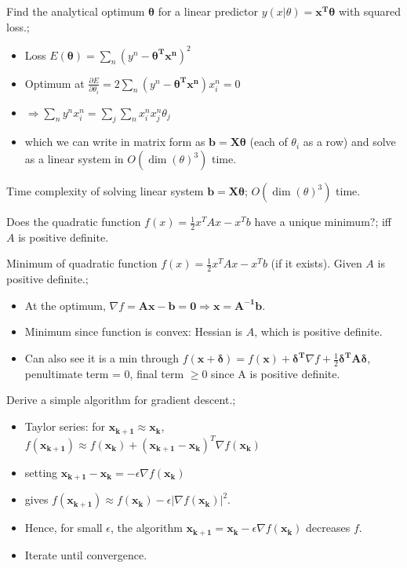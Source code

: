 \documentclass{article}
\begin{document}
Find the analytical optimum $\mathbf{\theta}$ for a linear predictor $y(x|\theta)=\mathbf{x^T \theta}$ with squared loss.; \begin{itemize} \item Loss $E(\mathbf{\theta}) = \sum_n (y^n - \mathbf{\theta^Tx^n})^2$ \item Optimum at $\frac{\partial E}{\partial \theta_i} = 2\sum_n (y^n - \mathbf{\theta^Tx^n})x^n_i = 0$ \item $\Rightarrow \sum_n y^n x^n_i = \sum_j \sum_n x^n_i x^n_j \theta_j$ \item which we can write in matrix form as $\mathbf{b = X\theta}$ (each of $\theta_i$ as a row) and solve as a linear system in $O(\dim(\theta)^3)$ time.  \end{itemize}

Time complexity of solving linear system $\mathbf{b=X\theta}$; $O(\dim(\theta)^3)$ time.

Does the quadratic function $f(x)=\frac{1}{2} x^TAx - x^Tb$ have a unique minimum?; iff $A$ is positive definite.


Minimum of quadratic function $f(x)=\frac{1}{2} x^TAx - x^Tb$ (if it exists). Given $A$ is positive definite.; \begin{itemize} \item At the optimum, $\nabla f = \mathbf{Ax-b=0}\Rightarrow \mathbf{x = A^{-1}b}$.  \item Minimum since function is convex: Hessian is $A$, which is positive definite.  \item Can also see it is a min through $f(\mathbf{x+\delta})=f(\mathbf{x})+\mathbf{\delta^T}\nabla f + \frac{1}{2}\mathbf{\delta^T A\delta}$, penultimate term = 0, final term $\geq 0$ since A is positive definite.  \end{itemize}

Derive a simple algorithm for gradient descent.; \begin{itemize} \item Taylor series: for $\mathbf{x_{k+1}\approx x_k}$, $f(\mathbf{x_{k+1}})\approx f(\mathbf{x_k})+(\mathbf{x_{k+1}-x_k})^T\nabla f(\mathbf{x_k})$ \item setting $\mathbf{x_{k+1}-x_k}=-\epsilon \nabla f(\mathbf{x_k})$ \item gives $f(\mathbf{x_{k+1}}) \approx f(\mathbf{x_k}) - \epsilon |\nabla f(\mathbf{x_k})|^2$.  \item Hence, for small $\epsilon$, the algorithm $\mathbf{x_{k+1}}=\mathbf{x_k}-\epsilon\nabla f(\mathbf{x_k})$ decreases $f$.  \item Iterate until convergence.  \end{itemize}
\end{document}
